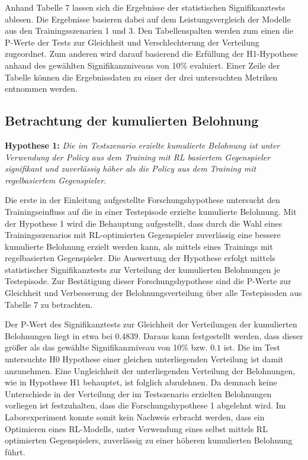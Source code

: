 Anhand Tabelle 7 lassen sich die Ergebnisse der statistischen Signifikanztests ablesen.
Die Ergebnisse basieren dabei auf dem Leistungsvergleich der Modelle aus den Trainingsszenarien 1 und 3.
Den Tabellenspalten werden zum einen die P-Werte der Tests zur Gleichheit und Verschlechterung der Verteilung zugeordnet.
Zum anderen wird darauf basierend die Erfüllung der H1-Hypothese anhand des gewählten Signifikanzniveaus von 10\% evaluiert.
Einer Zeile der Tabelle können die Ergebnissdaten zu einer der drei untersuchten Metriken entnommen werden.

\subsection{Betrachtung der kumulierten Belohnung}

\textbf{Hypothese 1:}
\textit{Die im Testszenario erzielte kumulierte Belohnung ist unter Verwendung der Policy aus dem Training mit RL basiertem Gegenspieler signifikant und zuverlässig höher als die Policy aus dem Training mit regelbasiertem Gegenspieler.}

Die erste in der Einleitung aufgestellte Forschungshypothese untersucht den Trainingseinfluss auf die in einer Testepisode erzielte kumulierte Belohnung.
Mit der Hypothese 1 wird die Behauptung aufgestellt, dass durch die Wahl eines Trainingsszenarios mit RL-optimierten Gegenspieler zuverlässig eine bessere kumulierte Belohnung erzielt werden kann, als mittels eines Trainings mit regelbasierten Gegenspieler.
Die Auswertung der Hypothese erfolgt mittels statistischer Signifikanztests zur Verteilung der kumulierten Belohnungen je Testepisode.
Zur Bestätigung dieser Forschungshypothese sind die P-Werte zur Gleichheit und Verbesserung der Belohnungsverteilung über alle Testepisoden aus Tabelle 7 zu betrachten. 

Der P-Wert des Signifikanztests zur Gleichheit der Verteilungen der kumulierten Belohnungen liegt in etwa bei $0.4839$.
Daraus kann festgestellt werden, dass dieser größer als das gewählte Signifikanzniveau von 10\% bzw. $0.1$ ist.
Die im Test untersuchte H0 Hypothese einer gleichen unterliegenden Verteilung ist damit anzunehmen.
Eine Ungleichheit der unterliegenden Verteilung der Belohnungen, wie in Hypothese H1 behauptet, ist folglich abzulehnen.
Da demnach keine Unterschiede in der Verteilung der im Testszenario erzielten Belohnungen vorliegen ist festzuhalten, dass die Forschungshypothese 1 abgelehnt wird.
Im Laborexperiment konnte somit kein Nachweis erbracht werden, dass ein Optimieren eines RL-Modells, unter Verwendung eines selbst mittels RL optimierten Gegenspielers, zuverlässig zu einer höheren kumulierten Belohnung führt.

